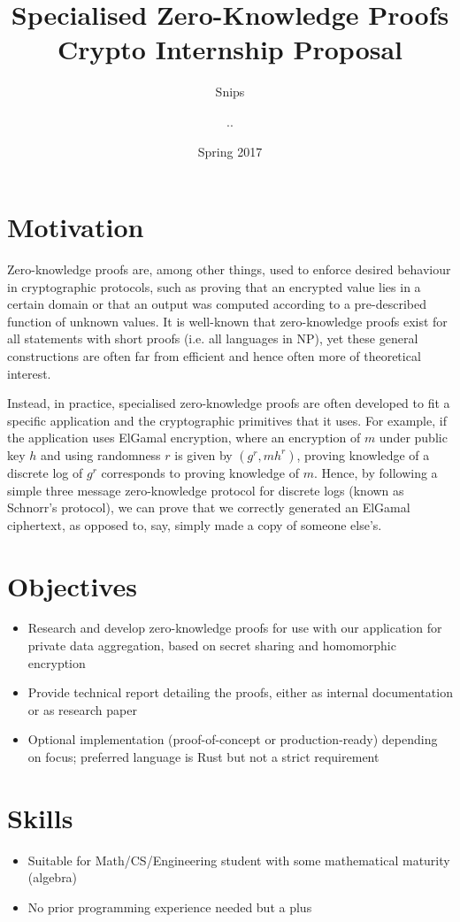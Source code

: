 \documentclass{article}
\title{Specialised Zero-Knowledge Proofs \\ {\large Crypto Internship Proposal}}
\author{{\small Snips} \and {\small ..}}
\date{Spring 2017}
\begin{document}
\maketitle

\section*{Motivation}
Zero-knowledge proofs are, among other things, used to enforce desired behaviour in cryptographic protocols, such as proving that an encrypted value lies in a certain domain or that an output was computed according to a pre-described function of unknown values. It is well-known that zero-knowledge proofs exist for all statements with short proofs (i.e. all languages in NP), yet these general constructions are often far from efficient and hence often more of theoretical interest. 

Instead, in practice, specialised zero-knowledge proofs are often developed to fit a specific application and the cryptographic primitives that it uses. For example, if the application uses ElGamal encryption, where an encryption of $m$ under public key $h$ and using randomness $r$ is given by $(g^r, m h^r)$, proving knowledge of a discrete log of $g^r$ corresponds to proving knowledge of $m$. Hence, by following a simple three message zero-knowledge protocol for discrete logs (known as Schnorr's protocol), we can prove that we correctly generated an ElGamal ciphertext, as opposed to, say, simply made a copy of someone else's.

\section*{Objectives}
\begin{itemize}
\item Research and develop zero-knowledge proofs for use with our application for private data aggregation, based on secret sharing and homomorphic encryption
\item Provide technical report detailing the proofs, either as internal documentation or as research paper
\item Optional implementation (proof-of-concept or production-ready) depending on focus; preferred language is Rust but not a strict requirement
\end{itemize}

\section*{Skills}
\begin{itemize}
\item Suitable for Math/CS/Engineering student with some mathematical maturity (algebra)
\item No prior programming experience needed but a plus
\end{itemize}
\end{document}
